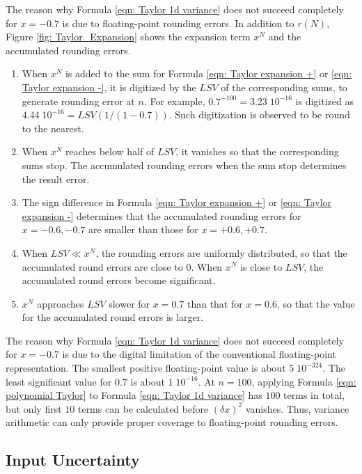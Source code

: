 \documentclass[twoside]{article}
\numberwithin{equation}{section}
\begin{document}
The reason why Formula \eqref{eqn: Taylor 1d variance} does not succeed completely for $x = -0.7$ is due to floating-point rounding errors.
In addition to $r(N)$, Figure \ref{fig: Taylor_Expansion} shows the expansion term $x^N$ and the accumulated rounding errors.
\begin{enumerate}
\item When $x^N$ is added to the sum for Formula \eqref{eqn: Taylor expansion +} or \eqref{eqn: Taylor expansion -}, it is digitized by the $LSV$ of the corresponding sums, to generate rounding error at $n$.
For example, $0.7^{-100}=3.23\; 10^{-16}$ is digitized as $4.44\; 10^{-16} = LSV(1/(1 - 0.7))$.
Such digitization is observed to be round to the nearest.

\item When $x^N$ reaches below half of $LSV$, it vanishes so that the corresponding sums stop.
The accumulated rounding errors when the sum stop determines the result error.

\item The sign difference in Formula \eqref{eqn: Taylor expansion +} or \eqref{eqn: Taylor expansion -} determines that the accumulated rounding errors for $x = -0.6, -0.7$ are smaller than those for $x = +0.6, +0.7$.

\item When $LSV \ll x^N$, the rounding errors are uniformly distributed, so that the accumulated round errors are close to $0$.
When $x^N$ is close to $LSV$, the accumulated round errors become significant.

\item $x^N$ approaches $LSV$ slower for $x = 0.7$ than that for $x = 0.6$, so that the value for the accumulated round errors is larger.

\end{enumerate}

The reason why Formula \eqref{eqn: Taylor 1d variance} does not succeed completely for $x = -0.7$ is due to the digital limitation of the conventional floating-point representation.
The smallest positive floating-point value is about $5\; 10^{-324}$. 
The least significant value for $0.7$ is about $1\; 10^{-16}$.
At $n=100$, applying Formula \eqref{eqn: polynomial Taylor} to Formula \eqref{eqn: Taylor 1d variance} has $100$ terms in total, but only first $10$ terms can be calculated before $(\delta x)^2$ vanishes.
Thus, variance arithmetic can only provide proper coverage to floating-point rounding errors. 


\subsection{Input Uncertainty}
\end{document}
